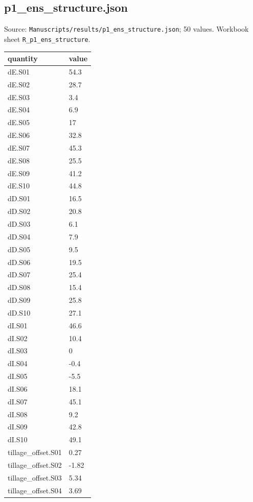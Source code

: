 \subsection*{p1\_ens\_structure.json}
\noindent\small Source: \nolinkurl{Manuscripts/results/p1_ens_structure.json}; 50 values. Workbook sheet \texttt{R\_p1\_ens\_structure}.\par
{\scriptsize\begin{longtable}{p{}p{}}\toprule\textbf{quantity} & \textbf{value}\\\midrule\endhead
{}dE.S01 & 54.3\\
{}dE.S02 & 28.7\\
{}dE.S03 & 3.4\\
{}dE.S04 & 6.9\\
{}dE.S05 & 17\\
{}dE.S06 & 32.8\\
{}dE.S07 & 45.3\\
{}dE.S08 & 25.5\\
{}dE.S09 & 41.2\\
{}dE.S10 & 44.8\\
{}dD.S01 & 16.5\\
{}dD.S02 & 20.8\\
{}dD.S03 & 6.1\\
{}dD.S04 & 7.9\\
{}dD.S05 & 9.5\\
{}dD.S06 & 19.5\\
{}dD.S07 & 25.4\\
{}dD.S08 & 15.4\\
{}dD.S09 & 25.8\\
{}dD.S10 & 27.1\\
{}dI.S01 & 46.6\\
{}dI.S02 & 10.4\\
{}dI.S03 & 0\\
{}dI.S04 & -0.4\\
{}dI.S05 & -5.5\\
{}dI.S06 & 18.1\\
{}dI.S07 & 45.1\\
{}dI.S08 & 9.2\\
{}dI.S09 & 42.8\\
{}dI.S10 & 49.1\\
{}tillage\_offset.S01 & 0.27\\
{}tillage\_offset.S02 & -1.82\\
{}tillage\_offset.S03 & 5.34\\
{}tillage\_offset.S04 & 3.69\\

\end{longtable}}

